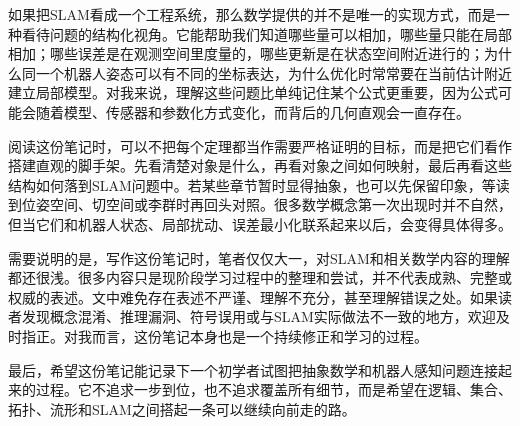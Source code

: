 如果把SLAM看成一个工程系统，那么数学提供的并不是唯一的实现方式，而是一种看待问题的结构化视角。它能帮助我们知道哪些量可以相加，哪些量只能在局部相加；哪些误差是在观测空间里度量的，哪些更新是在状态空间附近进行的；为什么同一个机器人姿态可以有不同的坐标表达，为什么优化时常常要在当前估计附近建立局部模型。对我来说，理解这些问题比单纯记住某个公式更重要，因为公式可能会随着模型、传感器和参数化方式变化，而背后的几何直观会一直存在。

阅读这份笔记时，可以不把每个定理都当作需要严格证明的目标，而是把它们看作搭建直观的脚手架。先看清楚对象是什么，再看对象之间如何映射，最后再看这些结构如何落到SLAM问题中。若某些章节暂时显得抽象，也可以先保留印象，等读到位姿空间、切空间或李群时再回头对照。很多数学概念第一次出现时并不自然，但当它们和机器人状态、局部扰动、误差最小化联系起来以后，会变得具体得多。

需要说明的是，写作这份笔记时，笔者仅仅大一，对SLAM和相关数学内容的理解都还很浅。很多内容只是现阶段学习过程中的整理和尝试，并不代表成熟、完整或权威的表述。文中难免存在表述不严谨、理解不充分，甚至理解错误之处。如果读者发现概念混淆、推理漏洞、符号误用或与SLAM实际做法不一致的地方，欢迎及时指正。对我而言，这份笔记本身也是一个持续修正和学习的过程。

最后，希望这份笔记能记录下一个初学者试图把抽象数学和机器人感知问题连接起来的过程。它不追求一步到位，也不追求覆盖所有细节，而是希望在逻辑、集合、拓扑、流形和SLAM之间搭起一条可以继续向前走的路。
